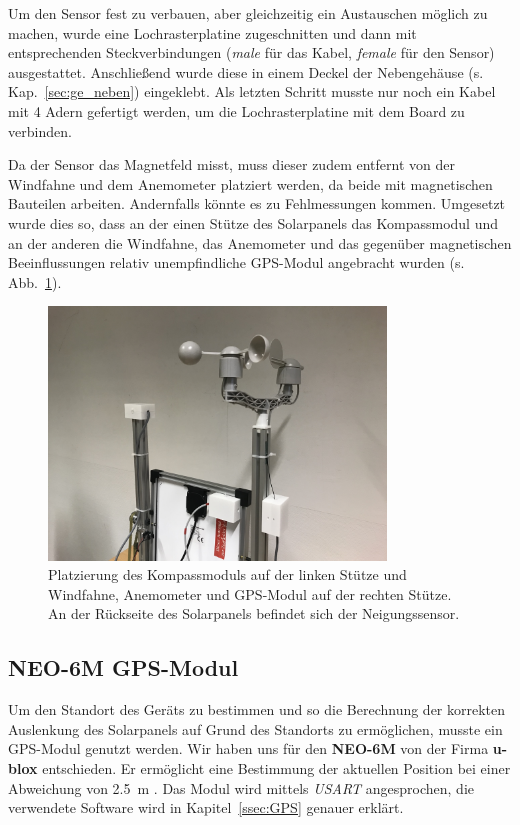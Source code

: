 Um den Sensor fest zu verbauen, aber gleichzeitig ein Austauschen möglich zu machen, wurde eine Lochrasterplatine zugeschnitten und dann mit entsprechenden Steckverbindungen (\textit{male} für das Kabel, \textit{female} für den Sensor) ausgestattet. Anschließend wurde diese in einem Deckel der Nebengehäuse (s. Kap.~\ref{sec:ge_neben}) eingeklebt. Als letzten Schritt musste nur noch ein Kabel mit 4 Adern gefertigt werden, um die Lochrasterplatine mit dem Board zu verbinden.

Da der Sensor das Magnetfeld misst, muss dieser zudem entfernt von der Windfahne und dem Anemometer platziert werden, da beide mit magnetischen Bauteilen arbeiten. Andernfalls könnte es zu Fehlmessungen kommen. Umgesetzt wurde dies so, dass an der einen Stütze des Solarpanels das Kompassmodul und an der anderen die Windfahne, das Anemometer und das gegenüber magnetischen Beeinflussungen relativ unempfindliche GPS-Modul angebracht wurden (s. Abb.~\ref{fig:Montage_Kompass_Wind}).

\begin{figure}[H]
 \centering
  \includegraphics[width=0.8\textwidth]{./img/Montage_Kompass_Wind.JPG}
  \caption{Platzierung des Kompassmoduls auf der linken Stütze und Windfahne, Anemometer und GPS-Modul auf der rechten Stütze. An der Rückseite des Solarpanels befindet sich der Neigungssensor.}\label{fig:Montage_Kompass_Wind}
\end{figure}

\subsection{NEO-6M GPS-Modul} %
Um den Standort des Geräts zu bestimmen und so die Berechnung der korrekten Auslenkung des Solarpanels auf Grund des Standorts zu ermöglichen, musste ein GPS-Modul genutzt werden. Wir haben uns für den \textbf{NEO-6M} von der Firma \textbf{u-blox} entschieden. Er ermöglicht eine Bestimmung der aktuellen Position bei einer Abweichung von \SI{2.5}{\meter} \cite{neo_GPS}. Das Modul wird mittels \textit{USART} angesprochen, die verwendete Software wird in Kapitel~\ref{ssec:GPS} genauer erklärt.

